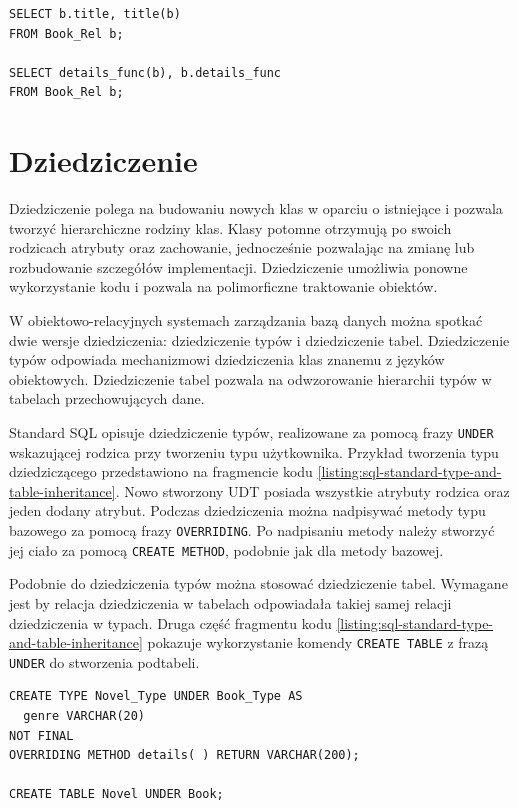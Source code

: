 \documentclass[a4paper,twoside,12pt]{book}
\begin{document}
\begin{lstlisting}[style=SQL, caption={Przykłady równoważnych notacji w PostgreSQL.}, label={listing:postgres-function-notation}, captionpos=b]
SELECT b.title, title(b) 
FROM Book_Rel b;

SELECT details_func(b), b.details_func 
FROM Book_Rel b;
\end{lstlisting}

\section{Dziedziczenie}

Dziedziczenie polega na budowaniu nowych klas w oparciu o istniejące i pozwala tworzyć hierarchiczne rodziny klas. Klasy potomne otrzymują po swoich rodzicach atrybuty oraz zachowanie, jednocześnie pozwalając na zmianę lub rozbudowanie szczegółów implementacji. Dziedziczenie umożliwia ponowne wykorzystanie kodu i pozwala na polimorficzne traktowanie obiektów.

W obiektowo-relacyjnych systemach zarządzania bazą danych można spotkać dwie wersje dziedziczenia: dziedziczenie typów i dziedziczenie tabel. Dziedziczenie typów odpowiada mechanizmowi dziedziczenia klas znanemu z języków obiektowych. Dziedziczenie tabel pozwala na odwzorowanie hierarchii typów w tabelach przechowujących dane.

Standard SQL opisuje dziedziczenie typów, realizowane za pomocą frazy \lstinline{UNDER} wskazującej rodzica przy tworzeniu typu użytkownika. Przykład tworzenia typu dziedziczącego przedstawiono na fragmencie kodu \ref{listing:sql-standard-type-and-table-inheritance}. Nowo stworzony UDT posiada wszystkie atrybuty rodzica oraz jeden dodany atrybut. Podczas dziedziczenia można nadpisywać metody typu bazowego za pomocą frazy \lstinline{OVERRIDING}. Po nadpisaniu metody należy stworzyć jej ciało za pomocą \lstinline{CREATE METHOD}, podobnie jak dla metody bazowej.

Podobnie do dziedziczenia typów można stosować dziedziczenie tabel. Wymagane jest by relacja dziedziczenia w tabelach odpowiadała takiej samej relacji dziedziczenia w typach. Druga część fragmentu kodu \ref{listing:sql-standard-type-and-table-inheritance} pokazuje wykorzystanie komendy \lstinline{CREATE TABLE} z frazą \lstinline{UNDER} do stworzenia podtabeli.

\begin{lstlisting}[style=SQL, caption={Dziedziczenie typu i tabeli według standardu SQL.}, label={listing:sql-standard-type-and-table-inheritance}, captionpos=b]
CREATE TYPE Novel_Type UNDER Book_Type AS
  genre VARCHAR(20)
NOT FINAL
OVERRIDING METHOD details( ) RETURN VARCHAR(200);

CREATE TABLE Novel UNDER Book;
\end{lstlisting}
\end{document}
